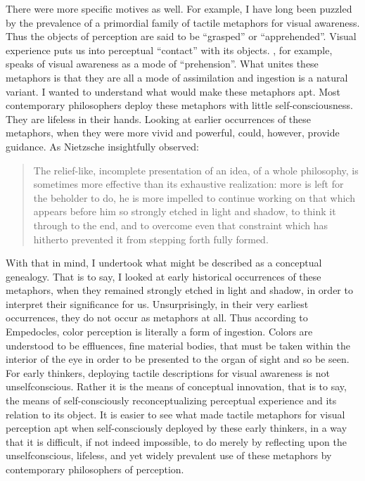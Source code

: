 There were more specific motives as well. For example, I have long been puzzled by the prevalence of a primordial family of tactile metaphors for visual awareness. Thus the objects of perception are said to be ``grasped'' or ``apprehended''. Visual experience puts us into perceptual ``contact'' with its objects. \citet{Broad:1965dq}, for example, speaks of visual awareness as a mode of ``prehension''. What unites these metaphors is that they are all a mode of assimilation and ingestion is a natural variant. I wanted to understand what would make these metaphors apt. Most contemporary philosophers deploy these metaphors with little self-consciousness. They are lifeless in their hands. Looking at earlier occurrences of these metaphors, when they were more vivid and powerful, could, however, provide guidance. As Nietzsche insightfully observed:
\begin{quote}
The relief-like, incomplete presentation of an idea, of a whole philosophy, is sometimes more effective than its exhaustive realization: more is left for the beholder to do, he is more impelled to continue working on that which appears before him so strongly etched in light and shadow, to think it through to the end, and to overcome even that constraint which has hitherto prevented it from stepping forth fully formed. \citep[§178 92]{Nietzsche:1996na}
\end{quote}
With that in mind, I undertook what might be described as a conceptual genealogy. That is to say, I looked at early historical occurrences of these metaphors, when they remained strongly etched in light and shadow, in order to interpret their significance for us. Unsurprisingly, in their very earliest occurrences, they do not occur as metaphors at all. Thus according to Empedocles, color perception is literally a form of ingestion. Colors are understood to be effluences, fine material bodies, that must be taken within the interior of the eye in order to be presented to the organ of sight and so be seen. For early thinkers, deploying tactile descriptions for visual awareness is not unselfconscious. Rather it is the means of conceptual innovation, that is to say, the means of self-consciously reconceptualizing perceptual experience and its relation to its object. It is easier to see what made tactile metaphors for visual perception apt when self-consciously deployed by these early thinkers, in a way that it is difficult, if not indeed impossible, to do merely by reflecting upon the unselfconscious, lifeless, and yet widely prevalent use of these metaphors by contemporary philosophers of perception.

